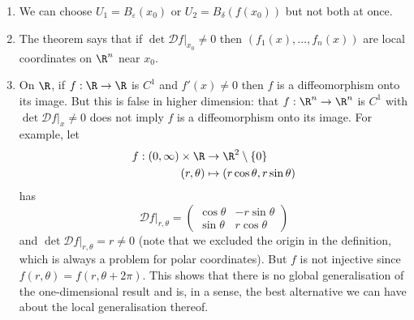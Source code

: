 \documentclass[a4paper]{article}
\newcommand*{\D}{\mathcal{D}}
\theoremstyle{definition}
\begin{document}
\begin{remark}\leavevmode
  \begin{enumerate}
  \item We can choose \(U_1 = B_\varepsilon(x_0)\) or \(U_2 = B_\delta(f(x_0))\) but not both at once.
  \item The theorem says that if \(\det \D f|_{x_0} \neq 0\) then \((f_1(x), \dots, f_n(x))\) are local coordinates on \(\R^n\) near \(x_0\).
  \item On \(\R\), if \(f: \R \to \R\) is \(C^1\) and \(f'(x) \neq 0\) then \(f\) is a diffeomorphism onto its image. But this is false in higher dimension: that \(f: \R^n \to \R^n\) is \(C^1\) with \(\det \D f|_x \neq 0\) does not imply \(f\) is a diffeomorphism onto its image. For example, let
    \begin{align*}
      f: (0, \infty) \times \R &\to \R^2 \setminus \{0\} \\
      (r, \theta) &\mapsto (r \cos \theta, r \sin \theta)
    \end{align*}
    has
    \[
      \D f|_{r, \theta} =
      \begin{pmatrix}
        \cos \theta & -r \sin \theta \\
        \sin \theta & r \cos \theta
      \end{pmatrix}
    \]
    and \(\det \D f|_{r, \theta} = r \neq 0\) (note that we excluded the origin in the definition, which is always a problem for polar coordinates). But \(f\) is not injective since \(f(r, \theta) = f(r, \theta + 2\pi)\). This shows that there is no global generalisation of the one-dimensional result and  is, in a sense, the best alternative we can have about the local generalisation thereof.
  \end{enumerate}
\end{remark}
\end{document}
